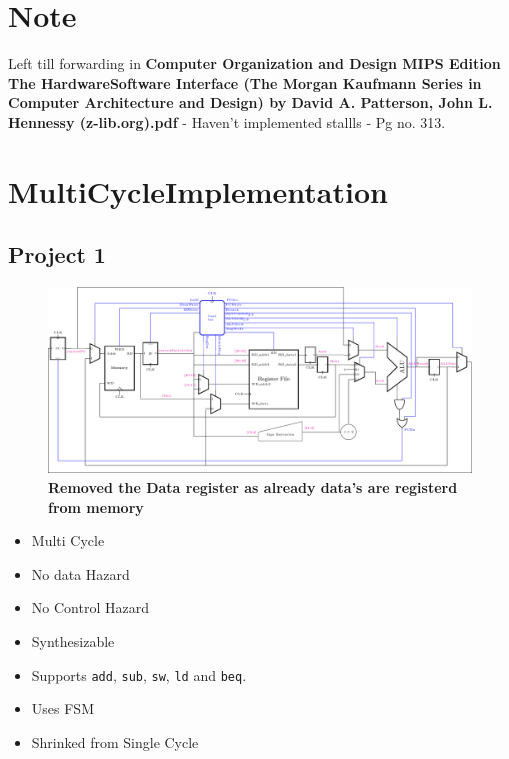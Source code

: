 \documentclass{article}
\begin{document}
\section*{Note}
\quad Left till forwarding in \textbf{Computer Organization and Design MIPS Edition The HardwareSoftware Interface (The Morgan Kaufmann Series in Computer Architecture and Design) by David A. Patterson, John L. Hennessy (z-lib.org).pdf} - Haven't implemented stallls - Pg no. 313.



\section*{MultiCycleImplementation}

\subsection*{Project 1}
\begin{figure}[H]
    \begin{center}
        \includegraphics[scale=0.75]{MultiCycleImplementation/TexFiles/MultiCycle1.pdf}
        \caption*{\textbf{Removed the Data register as already data's are registerd from memory}}
    \end{center}
\end{figure}


\begin{itemize}
    \item Multi Cycle
    \item No data Hazard
    \item No Control Hazard
    \item Synthesizable
    \item Supports \verb|add|, \verb|sub|, \verb|sw|, \verb|ld| and \verb|beq|.
    \item Uses FSM
    \item Shrinked from Single Cycle
\end{itemize}
\end{document}
